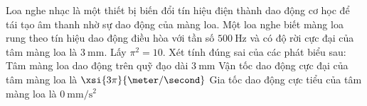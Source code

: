 \begin{ex}
Loa nghe nhạc là một thiết bị biến đổi tín hiệu điện thành dao động cơ học để tái tạo âm thanh nhờ sự dao động của màng loa. Một loa nghe biết màng loa rung theo tín hiệu dao động điều hòa với tần số $\SI{500}{\hertz}$ và có độ rời cực đại của tâm màng loa là $\SI{3}{\milli\meter}$. Lấy $\pi^2=10$. Xét tính đúng sai của các phát biểu sau:
	{\True Tâm màng loa dao động trên quỹ đạo dài $\SI{3}{\milli\meter}$}
	{Vận tốc dao động cực đại của tâm màng loa là $\xsi{3\pi}{\meter/\second}$}
	{Gia tốc dao động cực tiểu của tâm màng loa là $\SI{0}{\milli\meter/\second^2}$}
\end{ex}
